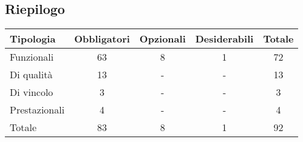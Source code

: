 \subsection{Riepilogo}
\begin{tabular}{|l|c|c|c|c|}
    \hline
    \textbf{Tipologia} & \textbf{Obbligatori} & \textbf{Opzionali} & \textbf{Desiderabili} & \textbf{Totale} \\
    \hline
    Funzionali & 63 & 8 & 1 & 72 \\
    \hline
    Di qualità & 13 & - & - & 13 \\
    \hline
    Di vincolo & 3 & - & - & 3 \\
    \hline
    Prestazionali & 4 & - & - & 4 \\
    \hline
    Totale & 83 & 8 & 1 & 92 \\
    \hline
\end{tabular}
